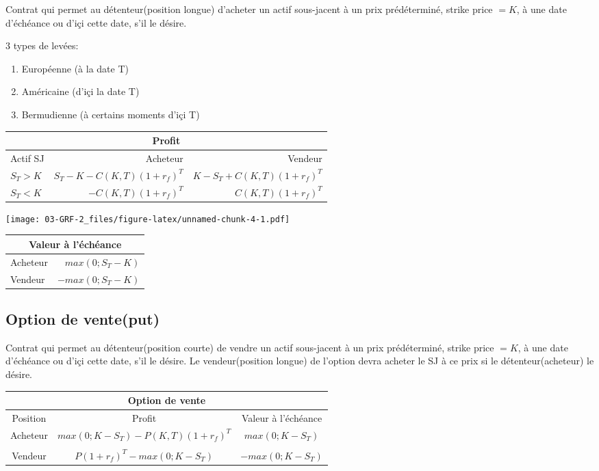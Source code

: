 \documentclass[]{book}
\providecommand{\tightlist}{%
  \setlength{\itemsep}{0pt}\setlength{\parskip}{0pt}}
\theoremstyle{definition}
\theoremstyle{definition}
\theoremstyle{definition}
\theoremstyle{remark}
\begin{document}
Contrat qui permet au détenteur(position longue) d'acheter un actif
sous-jacent à un prix prédéterminé, strike price \(=K\), à une date
d'échéance ou d'içi cette date, s'il le désire.

3 types de levées:

\begin{enumerate}
\def\labelenumi{\arabic{enumi}.}
\tightlist
\item
  Européenne (à la date T)
\item
  Américaine (d'içi la date T)
\item
  Bermudienne (à certains moments d'içi T)
\end{enumerate}

\begin{tabular}{lrr}
\toprule
\multicolumn{3}{c}{Profit} \\
\midrule
Actif SJ & Acheteur & Vendeur \\
\midrule
$S_T > K$ & $S_T - K - C(K,T)(1+r_f)^T$ & $K-S_T+C(K,T)(1+r_f)^T$\\
$S_T<K$ & $- C(K,T)(1+r_f)^T$ & $C(K,T)(1+r_f)^T$\\
\bottomrule
\end{tabular}

\texttt{[image: 03-GRF-2\_files/figure-latex/unnamed-chunk-4-1.pdf]}

\begin{tabularx}{0.5\textwidth}{Xr}
\toprule
\multicolumn{2}{c}{Valeur à l'échéance}\\
\midrule
Acheteur & $max(0;S_T-K)$\\
Vendeur & $-max(0;S_T-K)$\\
\bottomrule
\end{tabularx}

\subsection{Option de vente(put)}\label{option-de-venteput}

Contrat qui permet au détenteur(position courte) de vendre un actif
sous-jacent à un prix prédéterminé, strike price \(=K\), à une date
d'échéance ou d'içi cette date, s'il le désire. Le vendeur(position
longue) de l'option devra acheter le SJ à ce prix si le
détenteur(acheteur) le désire.

\begin{tabular}{ccc}
\toprule
\multicolumn{3}{c}{Option de vente} \\  
\midrule
Position & Profit & Valeur à l'échéance \\
\midrule
Acheteur & $max(0;K-S_T)-P(K,T)(1+r_f)^T$ & $max(0;K-S_T)$ \\
\\
Vendeur & $P(1+r_f)^T-max(0;K-S_T)$ & $-max(0;K-S_T)$\\
\bottomrule
\end{tabular}
\end{document}
